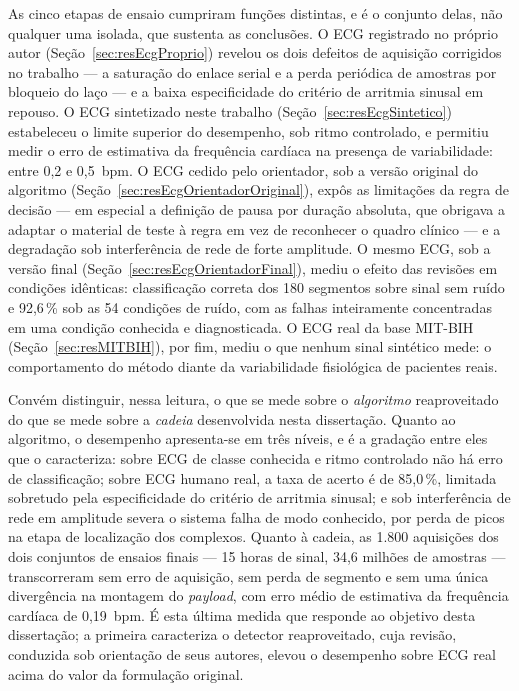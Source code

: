 As cinco etapas de ensaio cumpriram funções distintas, e é o conjunto delas, não qualquer uma
isolada, que sustenta as conclusões. O \acs{ECG} registrado no próprio autor
(Seção~\ref{sec:resEcgProprio}) revelou os dois defeitos de aquisição corrigidos no trabalho
--- a saturação do enlace serial e a perda periódica de amostras por bloqueio do laço --- e a
baixa especificidade do critério de arritmia sinusal em repouso. O \acs{ECG} sintetizado neste
trabalho (Seção~\ref{sec:resEcgSintetico}) estabeleceu o limite superior do desempenho, sob
ritmo controlado, e permitiu medir o erro de estimativa da frequência cardíaca na presença de
variabilidade: entre 0,2 e 0,5~bpm. O \acs{ECG} cedido pelo orientador, sob a versão original
do algoritmo (Seção~\ref{sec:resEcgOrientadorOriginal}), expôs as limitações da regra de
decisão --- em especial a definição de pausa por duração absoluta, que obrigava a adaptar o
material de teste à regra em vez de reconhecer o quadro clínico --- e a degradação sob
interferência de rede de forte amplitude. O mesmo \acs{ECG}, sob a versão final
(Seção~\ref{sec:resEcgOrientadorFinal}), mediu o efeito das revisões em condições idênticas:
classificação correta dos 180 segmentos sobre sinal sem ruído e 92,6\,\% sob as 54 condições
de ruído, com as falhas inteiramente concentradas em uma condição conhecida e diagnosticada. O
\acs{ECG} real da base MIT-BIH (Seção~\ref{sec:resMITBIH}), por fim, mediu o que nenhum sinal
sintético mede: o comportamento do método diante da variabilidade fisiológica de pacientes
reais.

Convém distinguir, nessa leitura, o que se mede sobre o \emph{algoritmo} reaproveitado do que
se mede sobre a \emph{cadeia} desenvolvida nesta dissertação. Quanto ao algoritmo, o
desempenho apresenta-se em três níveis, e é a gradação entre eles que o caracteriza: sobre
\acs{ECG} de classe conhecida e ritmo controlado não há erro de classificação; sobre \acs{ECG}
humano real, a taxa de acerto é de 85,0\,\%, limitada sobretudo pela especificidade do
critério de arritmia sinusal; e sob interferência de rede em amplitude severa o sistema falha
de modo conhecido, por perda de picos na etapa de localização dos complexos. Quanto à cadeia,
as 1.800 aquisições dos dois conjuntos de ensaios finais --- 15 horas de sinal, 34,6 milhões de amostras
--- transcorreram sem erro de aquisição, sem perda de segmento e sem uma única divergência na
montagem do \textit{payload}, com erro médio de estimativa da frequência cardíaca de
0,19~bpm. É esta última medida que responde ao objetivo desta dissertação; a primeira
caracteriza o detector reaproveitado, cuja revisão, conduzida sob orientação de seus autores,
elevou o desempenho sobre \acs{ECG} real acima do valor da formulação original.

